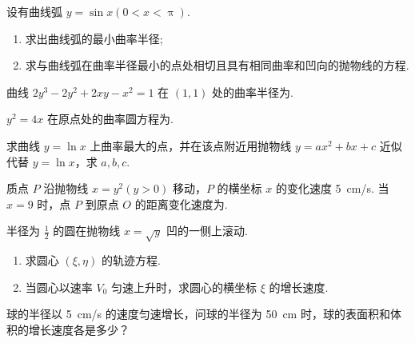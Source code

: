 	\begin{ti}
		设有曲线弧 $y = \sin x(0 < x < \uppi)$.
		\begin{enumerate}
			\item 求出曲线弧的最小曲率半径;
			\item 求与曲线弧在曲率半径最小的点处相切且具有相同曲率和凹向的抛物线的方程.
		\end{enumerate}
	\end{ti}

	\begin{ti}
		曲线 $2y^{3} - 2y^{2} + 2xy - x^{2} = 1$ 在 $(1,1)$ 处的曲率半径为\htwo.
	\end{ti}

	\begin{ti}
		$y^{2} = 4x$ 在原点处的曲率圆方程为\htwo.
	\end{ti}

	\begin{ti}
		求曲线 $y = \ln x$ 上曲率最大的点，并在该点附近用抛物线 $y = ax^{2} + bx + c$ 近似代替 $y = \ln x$，求 $a,b,c$.
	\end{ti}

	\begin{ti}
		质点 $P$ 沿抛物线 $x = y^{2}(y > 0)$ 移动，$P$ 的横坐标 $x$ 的变化速度 \SI{5}{cm/s}. 当 $x = 9$ 时，点 $P$ 到原点 $O$ 的距离变化速度为\htwo.
	\end{ti}

	\begin{ti}
		半径为 $\frac{1}{2}$ 的圆在抛物线 $x = \sqrt{y}$ 凹的一侧上滚动.
		\begin{enumerate}
			\item 求圆心 $(\xi,\eta)$ 的轨迹方程.
			\item 当圆心以速率 $V_{0}$ 匀速上升时，求圆心的横坐标 $\xi$ 的增长速度.
		\end{enumerate}
	\end{ti}

	\begin{ti}
		球的半径以 \SI{5}{cm/s} 的速度匀速增长，问球的半径为 \SI{50}{cm} 时，球的表面积和体积的增长速度各是多少？
	\end{ti}